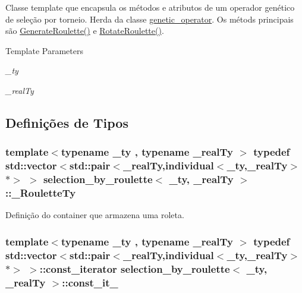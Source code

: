Classe template que encapsula os métodos e atributos de um operador genético de seleção por torneio. Herda da classe \hyperlink{classgenetic__operator}{genetic\_\-operator}. Os métods principais são \hyperlink{classselection__by__roulette_ac3db5bbe67ee2aa4e1942fd983d3cc80}{GenerateRoulette()} e \hyperlink{classselection__by__roulette_ae19e7e752f54ab03983be567c8d10392}{RotateRoulette()}.


\begin{DoxyTemplParams}{Template Parameters}
\item[{\em \_\-ty}]\item[{\em \_\-realTy}]\end{DoxyTemplParams}


\subsection{Definições de Tipos}
\hypertarget{classselection__by__roulette_a4c224a095113f38dce7d98f10d8c0833}{
\subsubsection[{\_\-RouletteTy}]{\setlength{\rightskip}{0pt plus 5cm}template$<$typename \_\-ty , typename \_\-realTy $>$ typedef std::vector$<$std::pair$<$\_\-realTy,{\bf individual}$<$\_\-ty,\_\-realTy$>$$\ast$$>$ $>$ {\bf selection\_\-by\_\-roulette}$<$ \_\-ty, \_\-realTy $>$::{\bf \_\-RouletteTy}}}
\label{classselection__by__roulette_a4c224a095113f38dce7d98f10d8c0833}
Definição do container que armazena uma roleta. \hypertarget{classselection__by__roulette_ac64df0d86cf8396ce91df17d9ce27f0e}{
\subsubsection[{const\_\-it\_\-}]{\setlength{\rightskip}{0pt plus 5cm}template$<$typename \_\-ty , typename \_\-realTy $>$ typedef std::vector$<$std::pair$<$\_\-realTy,{\bf individual}$<$\_\-ty,\_\-realTy$>$$\ast$$>$ $>$::const\_\-iterator {\bf selection\_\-by\_\-roulette}$<$ \_\-ty, \_\-realTy $>$::{\bf const\_\-it\_\-}}}
\label{classselection__by__roulette_ac64df0d86cf8396ce91df17d9ce27f0e}

